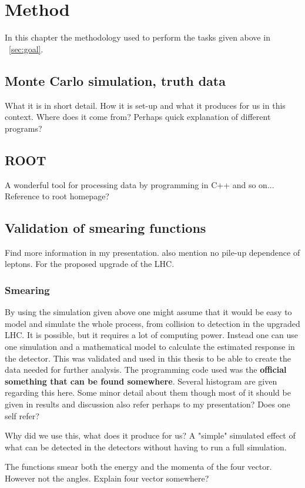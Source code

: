 \chapter{Method}\label{cha:meth}
In this chapter the methodology used to perform the tasks given above in ~\ref{sec:goal}.
\newpage
\section{Monte Carlo simulation, truth data}
What it is in short detail. How it is set-up and what it produces for us in this context. 
Where does it come from? Perhaps quick explanation of different programs?
\section{ROOT}
A wonderful tool for processing data by programming in C++ and so on... Reference to root homepage?
\section{Validation of smearing functions}
Find more information in my presentation. also mention no pile-up dependence of leptons.
For the proposed upgrade of the LHC.


\subsection{Smearing}
By using the simulation given above one might assume that it would be easy to model and simulate the whole process, from collision to detection in the upgraded LHC. It is possible, but it requires a lot of computing power. Instead one can use one simulation and a mathematical model to calculate the estimated response in the detector. This was validated and used in this thesis to be able to create the data needed for further analysis. The programming code used was the \textbf{official something that can be found somewhere}. 
Several histogram are given regarding this here. Some minor detail about them though most of it should be given in results and discussion also refer perhaps to my presentation? Does one self refer?


Why did we use this, what does it produce for us? A "simple" simulated effect of what can be detected in the detectors without having to run a full simulation. 

The functions smear both the energy and the momenta of the four vector. However not the angles. Explain four vector somewhere?

